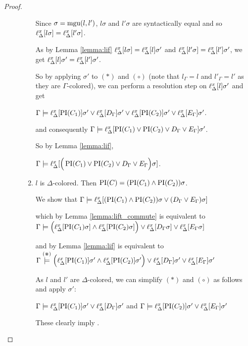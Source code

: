 \begin{proof}
\begin{description}
\begin{enumerate}
					Since $\sigma = \operatorname{mgu}(l, l')$, $l\sigma$ and $l'\sigma$ are syntactically equal and so $\ell_{\Delta}^{x}[l\sigma] = \ell_{\Delta}^{x}[l'\sigma]$.
					
					As by Lemma \ref{lemma:lif} $\ell_{\Delta}^{x}[l\sigma] = \ell_{\Delta}^{x}[l]\sigma'$ and $\ell_{\Delta}^{x}[l'\sigma] = \ell_{\Delta}^{x}[l']\sigma'$,
					we get $\ell_{\Delta}^{x}[l]\sigma' = \ell_{\Delta}^{x}[l']\sigma'$.\label{aou5jklah}

					So by applying $\sigma'$ to $(*)$ and $(\circ)$ (note that $l_\Gamma = l$ and $l'_\Gamma = l'$ as they are $\Gamma$-colored), we can perform a resolution step on $\ell_{\Delta}^{x}[l]\sigma'$ and get

					$\Gamma \models \ell_{\Delta}^{x}[\operatorname{PI}(C_1)]\sigma' \lor \ell_{\Delta}^{x}[D_\Gamma] \sigma' \lor \ell_{\Delta}^{x}[\operatorname{PI}(C_2)]\sigma' \lor \ell_{\Delta}^{x}[E_\Gamma] \sigma'$.

					and consequently
				$\Gamma \models \ell_{\Delta}^{x}[ \operatorname{PI}(C_1) \lor \operatorname{PI}(C_2) \lor D_\Gamma \lor E_\Gamma]\sigma' $.

				So by Lemma \ref{lemma:lif},

				$\Gamma \models \ell_{\Delta}^{x}[ \Big(\operatorname{PI}(C_1) \lor \operatorname{PI}(C_2) \lor D_\Gamma \lor E_\Gamma \Big) \sigma ] $.


				\item $l$ is $\Delta$-colored.
					Then $\operatorname{PI}(C) = (\operatorname{PI}(C_1) \land \operatorname{PI}(C_2))\sigma$. 

					We show that $\Gamma \models \ell_{\Delta}^{x}[(\operatorname{PI}(C_1) \land \operatorname{PI}(C_2))\sigma \lor (D_\Gamma \lor E_\Gamma)\sigma]$

					which by Lemma \ref{lemma:lift_commute} is equivalent to\newline
					$\Gamma \models \Big(\ell_{\Delta}^{x}[\operatorname{PI}(C_1)\sigma] \land \ell_{\Delta}^{x}[\operatorname{PI}(C_2)\sigma]\Big) \lor \ell_{\Delta}^{x}[D_\Gamma\sigma] \lor \ell_{\Delta}^{x}[E_\Gamma\sigma]$

					and by Lemma \ref{lemma:lif} is equivalent to\newline
					$\Gamma \stackrel{(\divideontimes)}{\models} \Big(\ell_{\Delta}^{x}[\operatorname{PI}(C_1)]\sigma' \land \ell_{\Delta}^{x}[\operatorname{PI}(C_2)]\sigma'\Big) \lor \ell_{\Delta}^{x}[D_\Gamma]\sigma' \lor \ell_{\Delta}^{x}[E_\Gamma]\sigma'$

					As $l$ and $l'$ are $\Delta$-colored, we can simplify $(*)$ and $(\circ)$ as follows and apply $\sigma'$:

					$\Gamma \models \ell_{\Delta}^{x}[\operatorname{PI}(C_1)]\sigma' \lor \ell_{\Delta}^{x}[D_\Gamma]\sigma' $ and $\Gamma \models \ell_{\Delta}^{x}[\operatorname{PI}(C_2)]\sigma' \lor \ell_{\Delta}^{x}[E_\Gamma]\sigma'$

					These clearly imply \markC.


\end{enumerate}
\end{description}
\end{proof}
